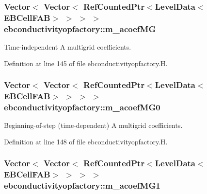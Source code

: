 \subsubsection[{\texorpdfstring{m\+\_\+acoef\+MG}{m_acoefMG}}]{\setlength{\rightskip}{0pt plus 5cm}Vector$<$ Vector$<$ Ref\+Counted\+Ptr$<$Level\+Data$<$E\+B\+Cell\+F\+AB$>$ $>$ $>$ $>$ ebconductivityopfactory\+::m\+\_\+acoef\+MG\hspace{0.3cm}{\ttfamily [protected]}}\hypertarget{classebconductivityopfactory_a1e52dfc92627a55ce1545f8c102f5934}{}\label{classebconductivityopfactory_a1e52dfc92627a55ce1545f8c102f5934}


Time-\/independent A multigrid coefficients. 



Definition at line 145 of file ebconductivityopfactory.\+H.

\subsubsection[{\texorpdfstring{m\+\_\+acoef\+M\+G0}{m_acoefMG0}}]{\setlength{\rightskip}{0pt plus 5cm}Vector$<$ Vector$<$ Ref\+Counted\+Ptr$<$Level\+Data$<$E\+B\+Cell\+F\+AB$>$ $>$ $>$ $>$ ebconductivityopfactory\+::m\+\_\+acoef\+M\+G0\hspace{0.3cm}{\ttfamily [protected]}}\hypertarget{classebconductivityopfactory_ad70974a6e0452217180c0e48ef5a0e00}{}\label{classebconductivityopfactory_ad70974a6e0452217180c0e48ef5a0e00}


Beginning-\/of-\/step (time-\/dependent) A multigrid coefficients. 



Definition at line 148 of file ebconductivityopfactory.\+H.

\subsubsection[{\texorpdfstring{m\+\_\+acoef\+M\+G1}{m_acoefMG1}}]{\setlength{\rightskip}{0pt plus 5cm}Vector$<$ Vector$<$ Ref\+Counted\+Ptr$<$Level\+Data$<$E\+B\+Cell\+F\+AB$>$ $>$ $>$ $>$ ebconductivityopfactory\+::m\+\_\+acoef\+M\+G1\hspace{0.3cm}{\ttfamily [protected]}}\hypertarget{classebconductivityopfactory_a6dad0d6e61b5543b7a74ea161ca921c6}{}\label{classebconductivityopfactory_a6dad0d6e61b5543b7a74ea161ca921c6}


